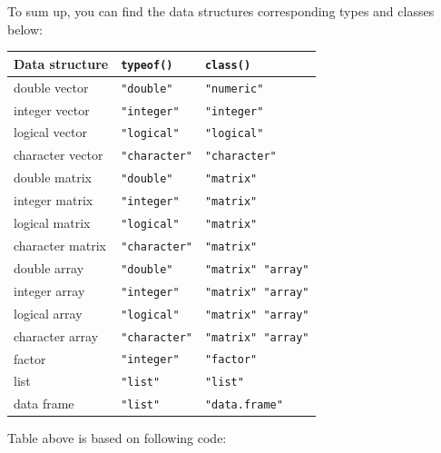 \documentclass[
]{book}
\begin{document}
To sum up, you can find the data structures corresponding types and classes below:

\begin{longtable}[]{@{}lll@{}}
\toprule
Data structure & \texttt{typeof()} & \texttt{class()}\tabularnewline
\midrule
\endhead
double vector & \texttt{"double"} & \texttt{"numeric"}\tabularnewline
integer vector & \texttt{"integer"} & \texttt{"integer"}\tabularnewline
logical vector & \texttt{"logical"} & \texttt{"logical"}\tabularnewline
character vector & \texttt{"character"} & \texttt{"character"}\tabularnewline
double matrix & \texttt{"double"} & \texttt{"matrix"}\tabularnewline
integer matrix & \texttt{"integer"} & \texttt{"matrix"}\tabularnewline
logical matrix & \texttt{"logical"} & \texttt{"matrix"}\tabularnewline
character matrix & \texttt{"character"} & \texttt{"matrix"}\tabularnewline
double array & \texttt{"double"} & \texttt{"matrix"\ "array"}\tabularnewline
integer array & \texttt{"integer"} & \texttt{"matrix"\ "array"}\tabularnewline
logical array & \texttt{"logical"} & \texttt{"matrix"\ "array"}\tabularnewline
character array & \texttt{"character"} & \texttt{"matrix"\ "array"}\tabularnewline
factor & \texttt{"integer"} & \texttt{"factor"}\tabularnewline
list & \texttt{"list"} & \texttt{"list"}\tabularnewline
data frame & \texttt{"list"} & \texttt{"data.frame"}\tabularnewline
\bottomrule
\end{longtable}

Table above is based on following code:
\end{document}
